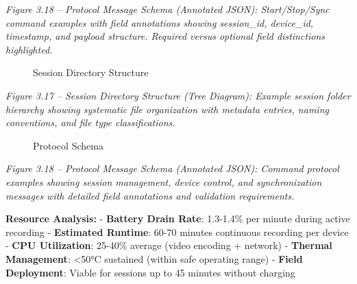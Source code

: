 \documentclass[12pt,a4paper]{article}
\begin{document}
\emph{Figure 3.18 -- Protocol Message Schema (Annotated JSON): Start/Stop/Sync command examples with field annotations showing session\_id, device\_id, timestamp, and payload structure. Required versus optional field distinctions highlighted.}

\begin{figure}
\centering
{}
\caption{Session Directory Structure}
\end{figure}

\emph{Figure 3.17 -- Session Directory Structure (Tree Diagram): Example session folder hierarchy showing systematic file organization with metadata entries, naming conventions, and file type classifications.}

\begin{figure}
\centering
{}
\caption{Protocol Schema}
\end{figure}

\emph{Figure 3.18 -- Protocol Message Schema (Annotated JSON): Command protocol examples showing session management, device control, and synchronization messages with detailed field annotations and validation requirements.}

\textbf{Resource Analysis:} - \textbf{Battery Drain Rate}: 1.3-1.4\% per minute during active recording - \textbf{Estimated Runtime}: 60-70 minutes continuous recording per device - \textbf{CPU Utilization}: 25-40\% average (video encoding + network) - \textbf{Thermal Management}: \textless50°C sustained (within safe operating range) - \textbf{Field Deployment}: Viable for sessions up to 45 minutes without charging
\end{document}
